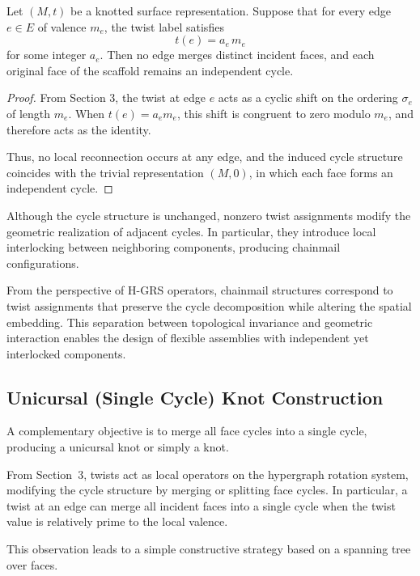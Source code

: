 \documentclass[acmtog,anonymous,review]{acmart}
\begin{document}
\begin{theorem}
Let $(M,t)$ be a knotted surface representation. Suppose that for every
edge $e \in E$ of valence $m_e$, the twist label satisfies
\[
t(e) = a_e \, m_e
\]
for some integer $a_e$. Then no edge merges distinct incident faces,
and each original face of the scaffold remains an independent cycle.
\end{theorem}

\begin{proof}
From Section 3, the twist at edge $e$ acts as a cyclic shift on the
ordering $\sigma_e$ of length $m_e$. When $t(e) = a_e m_e$, this shift
is congruent to zero modulo $m_e$, and therefore acts as the identity.

Thus, no local reconnection occurs at any edge, and the induced cycle
structure coincides with the trivial representation $(M,0)$, in which
each face forms an independent cycle.
\end{proof}

Although the cycle structure is unchanged, nonzero twist assignments
modify the geometric realization of adjacent cycles. In particular,
they introduce local interlocking between neighboring components,
producing chainmail configurations.

From the perspective of H-GRS operators, chainmail structures
correspond to twist assignments that preserve the cycle decomposition
while altering the spatial embedding. This separation between
topological invariance and geometric interaction enables the design
of flexible assemblies with independent yet interlocked components.




\subsection{Unicursal (Single Cycle) Knot Construction}

A complementary objective is to merge all face cycles into a single
cycle, producing a unicursal knot or simply a knot.

From Section~3, twists act as local operators on the hypergraph
rotation system, modifying the cycle structure by merging or splitting
face cycles. In particular, a twist at an edge can merge all incident
faces into a single cycle when the twist value is relatively prime to
the local valence.

This observation leads to a simple constructive strategy based on a
spanning tree over faces.
\end{document}
